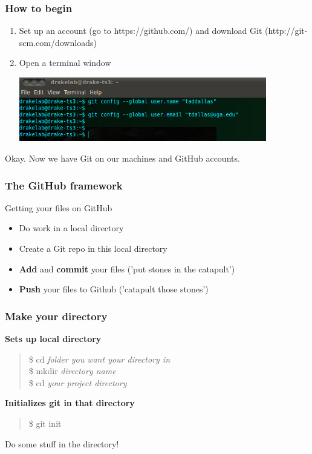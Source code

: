 \documentclass{beamer}\usepackage{graphicx, color}
\begin{document}
\begin{frame}
 \frametitle{How to begin}
\begin{enumerate}
 \item Set up an account (go to https://github.com/) and download Git (http://git-scm.com/downloads)
 \item Open a terminal window
\pause
\begin{center}
 \includegraphics[width=0.85\textwidth]{config.png}
\end{center}
\end{enumerate}
Okay. Now we have Git on our machines and GitHub accounts.
\end{frame}




\begin{frame}
 \frametitle{The GitHub framework}
\begin{block}{Getting your files on GitHub}
\begin{itemize}
 \item Do work in a local directory
 \item Create a Git repo in this local directory 
 \item \textbf{Add} and \textbf{commit} your files ('put stones in the catapult')
 \item \textbf{Push} your files to Github ('catapult those stones')
\end{itemize}
\end{block}


\end{frame}


\begin{frame}
 \frametitle{\textbf{Make your directory}}
\textbf{Sets up local directory} \\
\begin{quote}
  \$ cd \textit{folder you want your directory in} \\
\$ mkdir \textit{directory name} \\
\$ cd \textit{your project directory} \\
\end{quote}

\textbf{Initializes git in that directory}
\begin{quote}
 \$ git init
\end{quote}
Do some stuff in the directory!
\end{frame}
\end{document}
